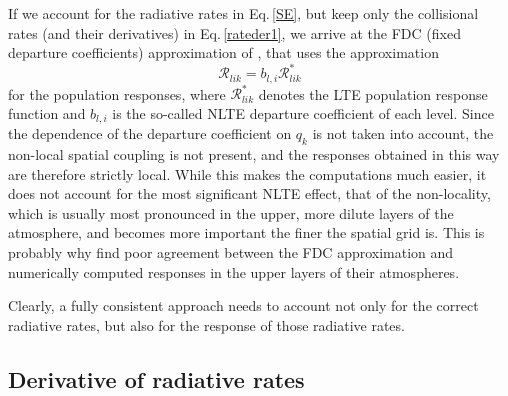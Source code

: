\documentclass[referee]{aa}
\begin{document}
If we account for the radiative rates in Eq.\,\ref{SE}, but keep only the collisional rates (and their derivatives) in Eq.\,\ref{rateder1}, we arrive at the FDC (fixed departure coefficients) approximation of \citet{HectorI}, that uses the approximation
\begin{equation}
{\mathcal R}_{lik} = b_{l,i}  {\mathcal R}^*_{lik}
\end{equation}
for the population responses, where ${\mathcal R}^*_{lik}$ denotes the LTE population response function and $b_{l,i}$ is the so-called NLTE departure coefficient of each level. Since the dependence of the departure coefficient on $q_k$ is not taken into account, the non-local spatial coupling is not present, and the responses obtained in this way are therefore strictly local. While this makes the computations much easier, it does not account for the most significant NLTE effect, that of the non-locality, which is usually most pronounced in the upper, more dilute layers of the atmosphere, and becomes more important the finer the spatial grid is. This is probably why \citet{HectorI} find poor agreement between the FDC approximation and numerically computed responses in the upper layers of their atmospheres.

Clearly, a fully consistent approach needs to account not only for the correct radiative rates, but also for the response of those radiative rates.

\subsection{Derivative of radiative rates}
\label{radiative_rates}
\end{document}
